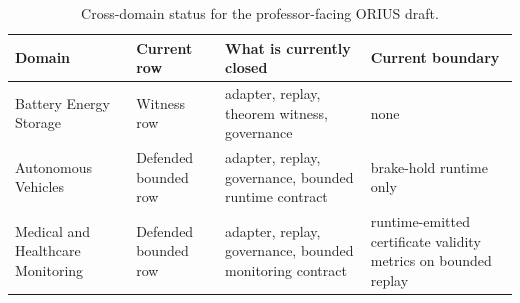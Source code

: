 \begin{table}[t]
\centering
\small
\caption{Cross-domain status for the professor-facing ORIUS draft.}
\label{tab:prof-cross-domain-status}
\begin{tabularx}{\textwidth}{@{}p{}p{}p{}p{}@{}}
\toprule
\textbf{Domain} & \textbf{Current row} & \textbf{What is currently closed} & \textbf{Current boundary} \\
\midrule
Battery Energy Storage & Witness row & adapter, replay, theorem witness, governance & none\\
Autonomous Vehicles & Defended bounded row & adapter, replay, governance, bounded runtime contract & brake-hold runtime only\\
Medical and Healthcare Monitoring & Defended bounded row & adapter, replay, governance, bounded monitoring contract & runtime-emitted certificate validity metrics on bounded replay\\
\bottomrule
\end{tabularx}
\end{table}
